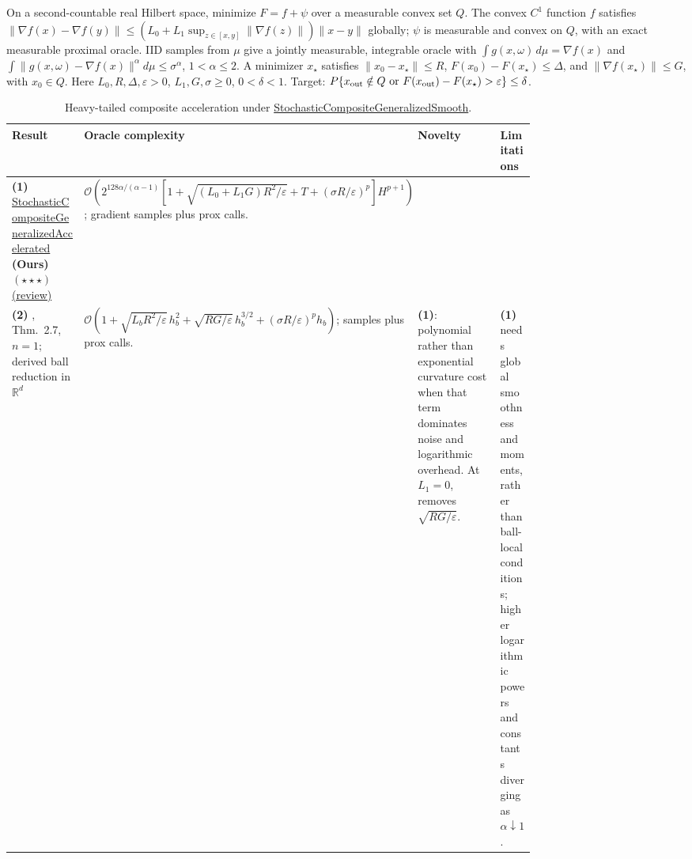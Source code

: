 \begin{table}[tp]
\centering
\caption{Heavy-tailed composite acceleration under \href{https://github.com/k3nfalt/longtails/blob/main/LongTails/Setups/StochasticCompositeGeneralizedSmooth.lean}{StochasticCompositeGeneralizedSmooth}.}\label{tab:StochasticCompositeGeneralizedSmooth}
\parbox{\linewidth}{\footnotesize On a second-countable real Hilbert space, minimize $F=f+\psi$ over a measurable convex set $Q$. The convex $C^1$ function $f$ satisfies $\|\nabla f(x)-\nabla f(y)\|\le(L_0+L_1\sup_{z\in[x,y]}\|\nabla f(z)\|)\|x-y\|$ globally; $\psi$ is measurable and convex on $Q$, with an exact measurable proximal oracle. IID samples from $\mu$ give a jointly measurable, integrable oracle with $\int g(x,\omega)\,d\mu=\nabla f(x)$ and $\int\|g(x,\omega)-\nabla f(x)\|^\alpha d\mu\le\sigma^\alpha$, $1<\alpha\le2$. A minimizer $x_\star$ satisfies $\|x_0-x_\star\|\le R$, $F(x_0)-F(x_\star)\le\Delta$, and $\|\nabla f(x_\star)\|\le G$, with $x_0\in Q$. Here $L_0,R,\Delta,\varepsilon>0$, $L_1,G,\sigma\ge0$, $0<\delta<1$. Target: $P\{x_{\rm out}\notin Q\ \text{or}\ F(x_{\rm out})-F(x_\star)>\varepsilon\}\le\delta$.}\par\smallskip
\begin{threeparttable}
\footnotesize
\setlength{\tabcolsep}{4pt}\renewcommand{\arraystretch}{1.25}
\begin{tabularx}{\linewidth}{@{}>{\raggedright\arraybackslash}p{0.20\linewidth}>{\raggedright\arraybackslash}p{0.32\linewidth}>{\raggedright\arraybackslash}p{0.25\linewidth}>{\raggedright\arraybackslash}X@{}}
\toprule
\textbf{Result} & \textbf{Oracle complexity} & \textbf{Novelty} & \textbf{Limitations} \\
\midrule
\textbf{(1)} \href{https://github.com/k3nfalt/longtails/blob/main/LongTails/Theorems/StochasticCompositeGeneralizedAccelerated.lean}{Stochastic\allowbreak Composite\allowbreak Generalized\allowbreak Accelerated} \textbf{(Ours)} $(\star\star\star)$ \href{https://github.com/k3nfalt/longtails/blob/main/scripts/reviews/StochasticCompositeGeneralizedAccelerated.md}{(review)} & $\mathcal{O}\!\left(2^{128\alpha/(\alpha-1)}\left[1+\sqrt{(L_0+L_1G)R^2/\varepsilon}+T+(\sigma R/\varepsilon)^p\right]H^{p+1}\right)$; gradient samples plus prox calls. & & \\
\midrule[1.2pt]
\textbf{(2)} \citep{scgsCompositeV2}, Thm.~2.7, $n=1$; derived ball reduction in $\mathbb R^d$ & $\mathcal{O}\!\left(1+\sqrt{L_bR^2/\varepsilon}\,h_b^2+\sqrt{RG/\varepsilon}\,h_b^{3/2}+(\sigma R/\varepsilon)^p h_b\right)$; samples plus prox calls. & \textbf{(1)}: polynomial rather than exponential curvature cost when that term dominates noise and logarithmic overhead. At $L_1=0$, removes $\sqrt{RG/\varepsilon}$. & \textbf{(1)} needs global smoothness and moments, rather than ball-local conditions; higher logarithmic powers and constants diverging as $\alpha\downarrow1$. \\

\end{tabularx}
\end{threeparttable}
\end{table}
